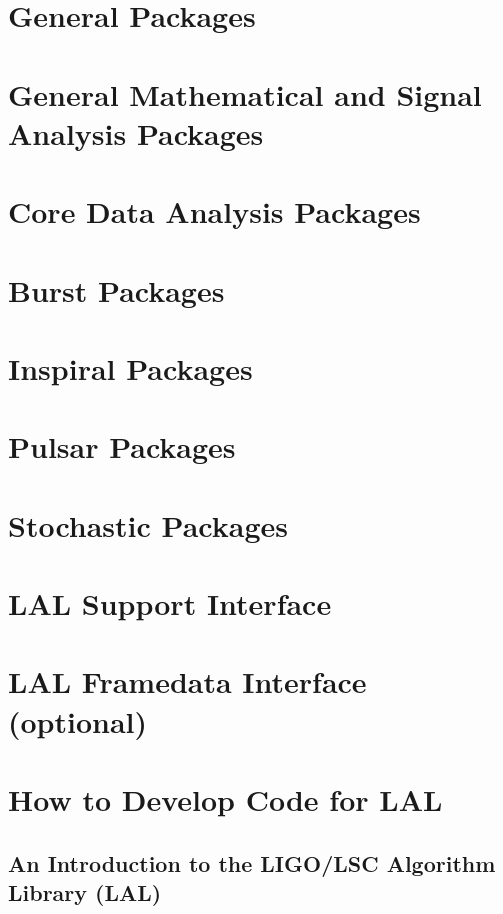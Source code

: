\documentclass[oneside]{book}
\begin{document}
\part{General Packages}

%



\part{General Mathematical and Signal Analysis Packages}




%


\part{Core Data Analysis Packages}

\part{Burst Packages}


%

\part{Inspiral Packages}




\part{Pulsar Packages}


\part{Stochastic Packages}

\part{LAL Support Interface}

\part{LAL Framedata Interface (optional)}



\part{How to Develop Code for LAL}

\chapter{An Introduction to the LIGO/LSC Algorithm Library (LAL)}
\end{document}
